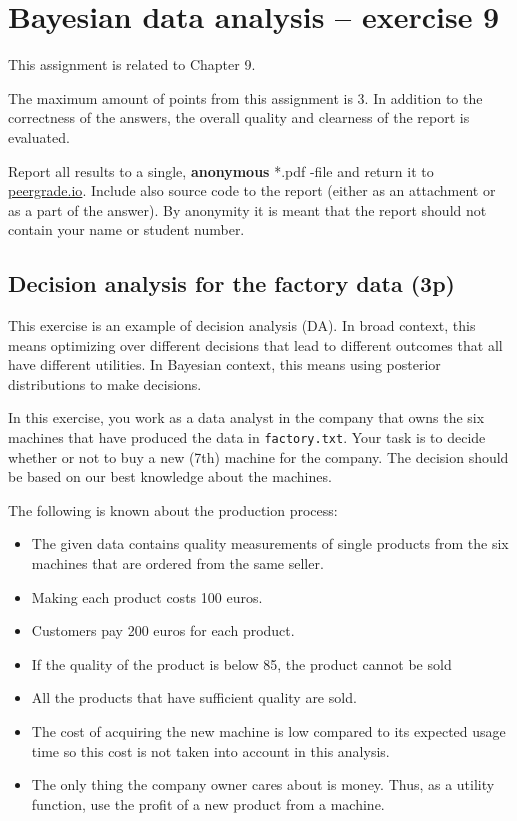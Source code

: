 \documentclass[a4paper,11pt]{article}
\begin{document}
\thispagestyle{empty}

\section*{Bayesian data analysis -- exercise 9}
This assignment is related to Chapter 9.

The maximum amount of points from this assignment is 3. In addition to the correctness of the answers, the overall quality and clearness of the report is evaluated.

Report all results to a single, {\bf anonymous} *.pdf -file and return it to \href{peergrade.io}{peergrade.io}. Include also source code to the report (either as an attachment or as a part of the answer). By anonymity it is meant that the report should not contain your name or student number.

\vspace{1cm}

\subsection*{Decision analysis for the factory data (3p)}

This exercise is an example of decision analysis (DA). In broad context, this means optimizing over different decisions that lead to different outcomes that all have different utilities. In Bayesian context, this means using posterior distributions to make decisions.  

In this exercise, you work as a data analyst in the company that owns the six machines that have produced the data in \texttt{factory.txt}. Your task is to decide whether or not to buy a new (7th) machine for the company. The decision should be based on our best knowledge about the machines.

The following is known about the production process: 
\begin{itemize} 
\item The given data contains quality measurements of single products from the six machines that are ordered from the same seller.
\item Making each product costs 100 euros.
\item Customers pay 200 euros for each product.
\item If the quality of the product is below 85, the product cannot be sold 
\item All the products that have sufficient quality are sold.
\item The cost of acquiring the new machine is low compared to its expected usage time so this cost is not taken into account in this analysis.
\item The only thing the company owner cares  about is money. Thus, as a utility function, use the profit of a new product from a machine.
\end{itemize}
\end{document}

